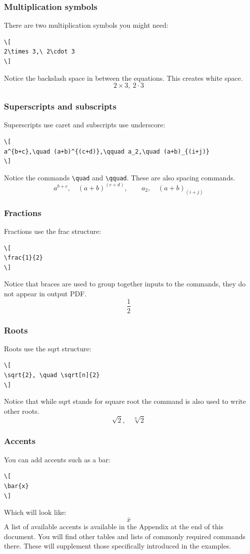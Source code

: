 \documentclass[a4paper,14pt]{extarticle}
\begin{document}
\subsubsection{Multiplication symbols}

There are two multiplication symbols you might need:
\begin{verbatim}
\[
2\times 3,\ 2\cdot 3
\]
\end{verbatim}
Notice the backslash space in between the equations. This creates white space. 
\[
2\times 3,\ 2\cdot 3
\]

\subsubsection{Superscripts and subscripts}

Superscripts use caret and subscripts use underscore:
\begin{verbatim}
\[
a^{b+c},\quad (a+b)^{(c+d)},\qquad a_2,\quad (a+b)_{(i+j)}
\]
\end{verbatim}
Notice the commands \verb=\quad= and \verb=\qquad=. These are also spacing commands. 
\[
a^{b+c},\quad (a+b)^{(c+d)},\qquad a_2,\quad (a+b)_{(i+j)}
\]


\subsubsection{Fractions}

Fractions use the frac structure:
\begin{verbatim}
\[
\frac{1}{2}
\]
\end{verbatim}
Notice that braces are used to group together inputs to the commands, they do not appear in output PDF.
\[
\frac{1}{2}
\]

\subsubsection{Roots}

Roots use the sqrt structure:
\begin{verbatim}
\[
\sqrt{2}, \quad \sqrt[n]{2}
\]
\end{verbatim}
Notice that while sqrt stands for square root the command is also used to write other roots.
\[
\sqrt{2}, \quad \sqrt[n]{2}
\]

\subsubsection{Accents}

You can add accents such as a bar: 
\begin{verbatim}
\[
\bar{x}
\] 
\end{verbatim}
Which will look like:
\[
\bar{x}
\] 
A list of available accents is available in the Appendix at the end of this document. You will find other tables and lists of commonly required commands there. These will supplement those specifically introduced in the examples. 
\end{document}

